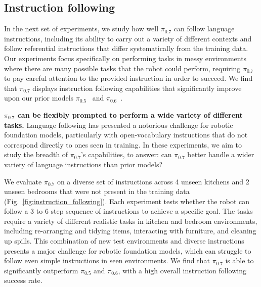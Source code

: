 \documentclass[conference]{IEEEtran}
\def \Pizf {$\pi_{0.5}$}
\def \Pizs {$\pi_{0.6}$}
\def \MethodName {$\pi_{0.7}$}
\begin{document}
\subsection{Instruction following}
\label{sec:instruction_following}

In the next set of experiments, we study how well \MethodName{} can follow language instructions, including its ability to carry out a variety of different contexts and follow referential instructions that differ systematically from the training data. Our experiments focus specifically on performing tasks in messy environments where there are many possible tasks that the robot could perform, requiring \MethodName{} to pay careful attention to the provided instruction in order to succeed. We find that \MethodName{} displays instruction following capabilities that significantly improve upon our prior models \Pizf{}~\cite{black2025pi05} and \Pizs~\cite{pi06model}.

\noindent \textbf{\MethodName{} can be flexibly prompted to perform a wide variety of different tasks.} Language following has presented a notorious challenge for robotic foundation models, particularly with open-vocabulary instructions that do not correspond directly to ones seen in training. In these experiments, we aim to study the breadth of \MethodName{}'s capabilities, to answer: can \MethodName{} better handle a wider variety of language instructions than prior models?

We evaluate \MethodName{} on a diverse set of instructions across 4 unseen kitchens and 2 unseen bedrooms that were not present in the training data (Fig.~\ref{fig:instruction_following}). Each experiment tests whether the robot can follow a 3 to 6 step sequence of instructions to achieve a specific goal. The tasks require a variety of different realistic tasks in kitchen and bedroom environments, including re-arranging and tidying items, interacting with furniture, and cleaning up spills. This combination of new test environments and diverse instructions presents a major challenge for robotic foundation models, which can struggle to follow even simple instructions in seen environments. We find that \MethodName{} is able to significantly outperform \Pizf{} and \Pizs{}, with a high overall instruction following success rate.
\end{document}
